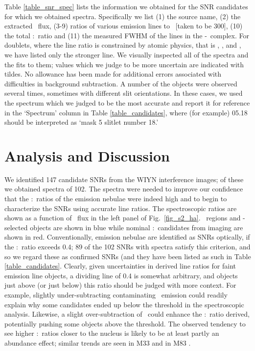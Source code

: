 
Table \ref{table_snr_spec}  lists the information we obtained for the SNR candidates for which we obtained spectra.  Specifically we list (1) the source name, (2) the extracted  \ha\ flux, (3-9) ratios of various emission lines to \ha\ [taken to be 300], (10) the total \sii:\ha\ ratio and (11) the measured FWHM of the lines in the \ha-\nii\ complex.  For doublets, where the line ratio is constrained by atomic physics, that is \oiii, \oi, and \nii, we have listed only the stronger line.  We visually inspected all of the spectra and the fits to them; values which we judge to be more uncertain are indicated with tildes.  No allowance has been made for additional errors associated with difficulties in background subtraction.  A number of the objects were observed several times, sometimes with different slit orientations.  In these cases, we used the spectrum which we judged to be the most accurate and report it for reference in the `Spectrum' column in Table \ref{table_candidates}, where (for example) 05.18 should be interpreted as `mask 5 slitlet number 18.'


\section{Analysis and Discussion}

We identified 147 candidate SNRs from the WIYN interference images; of these we obtained spectra of 102. The spectra were needed to improve our confidence that the \sii:\ha\ ratios of the emission nebulae were indeed high and to begin to characterize the SNRs using accurate line ratios.  The spectroscopic ratios are shown as a function of \ha\ flux in the left panel of  Fig.\ \ref{fig_s2_ha}. \hii\ regions and \oiii-selected objects are shown in blue while nominal \sii:\ha\ candidates from imaging are shown in red.   Conventionally, emission nebulae are identified as SNRs optically, if the \sii:\ha\ ratio exceeds 0.4; 89 of the 102 SNRs with spectra satisfy this criterion, and so we regard these as confirmed SNRs (and they have been listed as such in Table \ref{table_candidates}. Clearly, given uncertainties in derived line ratios for faint emission line objects, a dividing line of 0.4 is somewhat arbitrary, and objects just above (or just below) this ratio should be judged with more context.  For example, slightly under-subtracting contaminating \ha\ emission could readily explain why some candidates ended up below the threshold in the spectroscopic analysis. Likewise, a slight over-subtraction of \ha\ could enhance the \sii:\ha\ ratio derived, potentially pushing some objects above the threshold.  The observed tendency to see higher \sii:\ha\ ratios closer to the nucleus is likely to be at least partly an abundance effect; similar trends are seen in M33 \citep{long18} and in M83 \citep{winkler17}. 

